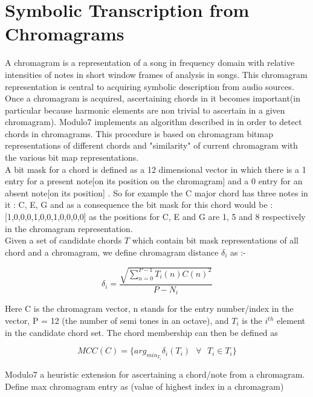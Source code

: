 \section{Symbolic Transcription from Chromagrams} \label{chromagramest}

\noindent A chromagram \cite{chromagramtutorial} is a representation of a song in frequency domain with relative intensities of notes in short window frames of analysis in songs. This chromagram representation is central to acquiring symbolic description from audio sources. Once a chromagram is acquired, ascertaining chords in it becomes important(in particular because harmonic elements are non trivial to ascertain in a given chromagram). Modulo7 implements an algorithm described in \cite{chord-detection} in order to detect chords in chromagrams. This procedure is based on chromagram bitmap representations of different chords and "similarity" of current chromagram with the various bit map representations. \\

\noindent A bit mask for a chord is defined as a 12 dimensional vector in which there is a 1 entry for a present note[on its position on the chromagram] and a 0 entry for an absent note[on its position] \cite{chord-detection}. So for example the C major chord has three notes in it : C, E, G and as a consequence the bit mask for this chord would be : [1,0,0,0,1,0,0,1,0,0,0,0] as the positions for C, E and G are 1, 5 and 8 respectively in the chromagram representation. \\

\noindent Given a set of candidate chords $T$ which contain bit mask representations of all chord and a chromagram, we define chromagram distance $\delta_i$ as \cite{chord-detection}:-

\begin{equation}
\delta_i = \frac{\sqrt{\sum_{n = 0}^{P - 1} T_i(n)C(n)^2}}{P - N_i}
\end{equation}

\noindent Here C is the chromagram vector, n stands for the entry number/index in the vector, P = 12 (the number of semi tones in an octave), and $T_i$ is the $i^{th}$ element in the candidate chord set. The chord membership can then be defined as 

\begin{equation}
MCC(C) = \{arg_{min_{T_i}} \delta_i (T_i) \ \ \ \forall \ \ \ T_i \in T_i \}
\end{equation}

\noindent Modulo7 a heuristic extension for ascertaining a chord/note from a chromagram. Define max chromagram entry as (value of highest index in a chromagram)

